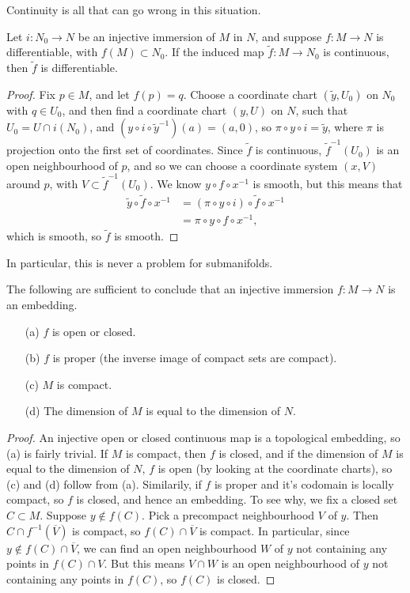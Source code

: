 Continuity is all that can go wrong in this situation.

\begin{theorem}
    Let $i: N_0 \to N$ be an injective immersion of $M$ in $N$, and suppose $f: M \to N$ is differentiable, with $f(M) \subset N_0$. If the induced map $\tilde{f}: M \to N_0$ is continuous, then $\tilde{f}$ is differentiable.
\end{theorem}
\begin{proof}
    Fix $p \in M$, and let $f(p) = q$. Choose a coordinate chart $(\tilde{y},U_0)$ on $N_0$ with $q \in U_0$, and then find a coordinate chart $(y,U)$ on $N$, such that $U_0 = U \cap i(N_0)$, and $(y \circ i \circ \tilde{y}^{-1})(a) = (a,0)$, so $\pi \circ y \circ i = \tilde{y}$, where $\pi$ is projection onto the first set of coordinates. Since $\tilde{f}$ is continuous, $\tilde{f}^{-1}(U_0)$ is an open neighbourhood of $p$, and so we can choose a coordinate system $(x,V)$ around $p$, with $V \subset \tilde{f}^{-1}(U_0)$. We know $y \circ f \circ x^{-1}$ is smooth, but this means that
    \begin{align*}
        \tilde{y} \circ \tilde{f} \circ x^{-1} &= ( \pi \circ y \circ i) \circ \tilde{f} \circ x^{-1}\\
        &= \pi \circ y \circ f \circ x^{-1},
    \end{align*}
    which is smooth, so $\tilde{f}$ is smooth.
\end{proof}

In particular, this is never a problem for submanifolds.

\begin{theorem}
    The following are sufficient to conclude that an injective immersion $f: M \to N$ is an embedding.
    \begin{enumerate}
        \item[(a)] $f$ is open or closed.
        \item[(b)] $f$ is proper (the inverse image of compact sets are compact).
        \item[(c)] $M$ is compact.
        \item[(d)] The dimension of $M$ is equal to the dimension of $N$.
    \end{enumerate}
\end{theorem}
\begin{proof}
    An injective open or closed continuous map is a topological embedding, so (a) is fairly trivial. If $M$ is compact, then $f$ is closed, and if the dimension of $M$ is equal to the dimension of $N$, $f$ is open (by looking at the coordinate charts), so (c) and (d) follow from (a). Similarily, if $f$ is proper and it's codomain is locally compact, so $f$ is closed, and hence an embedding. To see why, we fix a closed set $C \subset M$. Suppose $y \not \in f(C)$. Pick a precompact neighbourhood $V$ of $y$. Then $C \cap f^{-1}(\overline{V})$ is compact, so $f(C) \cap \overline{V}$ is compact. In particular, since $y \not \in f(C) \cap \overline{V}$, we can find an open neighbourhood $W$ of $y$ not containing any points in $f(C) \cap V$. But this means $V \cap W$ is an open neighbourhood of $y$ not containing any points in $f(C)$, so $f(C)$ is closed.
\end{proof}

